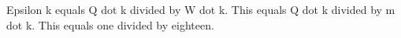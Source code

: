 Epsilon k equals Q dot k divided by W dot k.  
This equals Q dot k divided by m dot k.  
This equals one divided by eighteen.